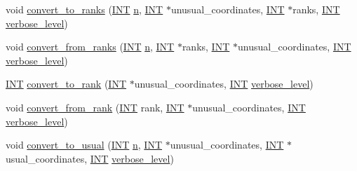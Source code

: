 \begin{DoxyCompactItemize}
\item 
void \mbox{\hyperlink{classunusual__model_ab5cdb8ec08ae842b6ae4831385e9934b}{convert\+\_\+to\+\_\+ranks}} (\mbox{\hyperlink{galois_8h_a09fddde158a3a20bd2dcadb609de11dc}{I\+NT}} \mbox{\hyperlink{simeon_8_c_a7f2cd26777ce0ff3fdaf8d02aacbddfb}{n}}, \mbox{\hyperlink{galois_8h_a09fddde158a3a20bd2dcadb609de11dc}{I\+NT}} $\ast$unusual\+\_\+coordinates, \mbox{\hyperlink{galois_8h_a09fddde158a3a20bd2dcadb609de11dc}{I\+NT}} $\ast$ranks, \mbox{\hyperlink{galois_8h_a09fddde158a3a20bd2dcadb609de11dc}{I\+NT}} \mbox{\hyperlink{simeon_8_c_a818073fbcc2f439e7c56952f67386122}{verbose\+\_\+level}})
\item 
void \mbox{\hyperlink{classunusual__model_affe6f50031dfc606a0dca7ff5e26cc14}{convert\+\_\+from\+\_\+ranks}} (\mbox{\hyperlink{galois_8h_a09fddde158a3a20bd2dcadb609de11dc}{I\+NT}} \mbox{\hyperlink{simeon_8_c_a7f2cd26777ce0ff3fdaf8d02aacbddfb}{n}}, \mbox{\hyperlink{galois_8h_a09fddde158a3a20bd2dcadb609de11dc}{I\+NT}} $\ast$ranks, \mbox{\hyperlink{galois_8h_a09fddde158a3a20bd2dcadb609de11dc}{I\+NT}} $\ast$unusual\+\_\+coordinates, \mbox{\hyperlink{galois_8h_a09fddde158a3a20bd2dcadb609de11dc}{I\+NT}} \mbox{\hyperlink{simeon_8_c_a818073fbcc2f439e7c56952f67386122}{verbose\+\_\+level}})
\item 
\mbox{\hyperlink{galois_8h_a09fddde158a3a20bd2dcadb609de11dc}{I\+NT}} \mbox{\hyperlink{classunusual__model_ac3c9a8673189d7f889ff019f1c2a9bf7}{convert\+\_\+to\+\_\+rank}} (\mbox{\hyperlink{galois_8h_a09fddde158a3a20bd2dcadb609de11dc}{I\+NT}} $\ast$unusual\+\_\+coordinates, \mbox{\hyperlink{galois_8h_a09fddde158a3a20bd2dcadb609de11dc}{I\+NT}} \mbox{\hyperlink{simeon_8_c_a818073fbcc2f439e7c56952f67386122}{verbose\+\_\+level}})
\item 
void \mbox{\hyperlink{classunusual__model_a54cf56041ed1ebe0517a2a4005932249}{convert\+\_\+from\+\_\+rank}} (\mbox{\hyperlink{galois_8h_a09fddde158a3a20bd2dcadb609de11dc}{I\+NT}} rank, \mbox{\hyperlink{galois_8h_a09fddde158a3a20bd2dcadb609de11dc}{I\+NT}} $\ast$unusual\+\_\+coordinates, \mbox{\hyperlink{galois_8h_a09fddde158a3a20bd2dcadb609de11dc}{I\+NT}} \mbox{\hyperlink{simeon_8_c_a818073fbcc2f439e7c56952f67386122}{verbose\+\_\+level}})
\item 
void \mbox{\hyperlink{classunusual__model_a80bd3b8fc5c7332b9629e17ac3ad2c76}{convert\+\_\+to\+\_\+usual}} (\mbox{\hyperlink{galois_8h_a09fddde158a3a20bd2dcadb609de11dc}{I\+NT}} \mbox{\hyperlink{simeon_8_c_a7f2cd26777ce0ff3fdaf8d02aacbddfb}{n}}, \mbox{\hyperlink{galois_8h_a09fddde158a3a20bd2dcadb609de11dc}{I\+NT}} $\ast$unusual\+\_\+coordinates, \mbox{\hyperlink{galois_8h_a09fddde158a3a20bd2dcadb609de11dc}{I\+NT}} $\ast$usual\+\_\+coordinates, \mbox{\hyperlink{galois_8h_a09fddde158a3a20bd2dcadb609de11dc}{I\+NT}} \mbox{\hyperlink{simeon_8_c_a818073fbcc2f439e7c56952f67386122}{verbose\+\_\+level}})

\end{DoxyCompactItemize}
